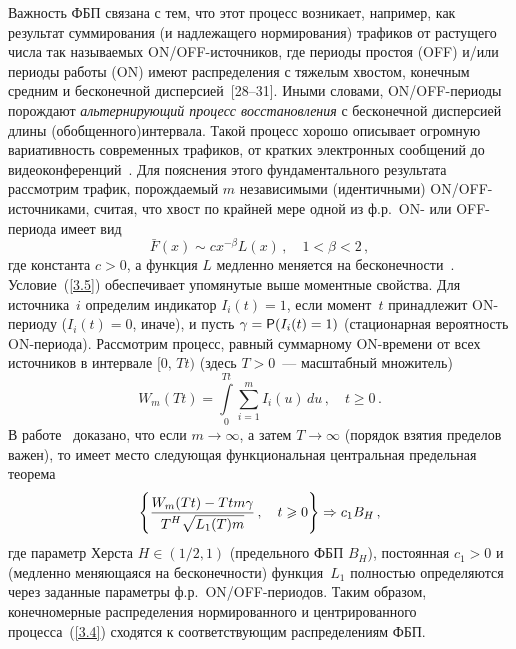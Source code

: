 \begin{multicols}{2}
Важность ФБП связана с тем, что этот процесс возникает, например,
как результат суммирования (и надлежащего нормирования) трафиков от
растущего числа так называемых ON/OFF-ис\-точн\-иков, где пе\-рио\-ды простоя (OFF) и/или пе\-рио\-ды
работы (ON) имеют распределения с
тяжелым хвос\-том, конечным средним и бесконечной дис\-пер\-си\-ей~[28--31].
Иными словами, ON/OFF-пе\-рио\-ды порождают {\it альтернирующий процесс восстановления} с бесконечной
дисперсией длины (обобщенного)\linebreak интервала. Такой процесс хорошо
описывает огромную вариативность современных трафиков, от кратких
электронных сообщений до видеоконференций~\cite {Will}. Для
пояснения этого фундаментального результата рассмотрим трафик,
по\-рож\-да\-емый $m$ независимыми (идентичными) ON/\linebreak OFF-источниками,
считая, что хвост по крайней мере одной из ф.р.\ ON- или OFF-периода имеет вид
\begin{equation}
 \bar F(x)\sim c x^{-\beta}L (x)\,,\quad 1<\beta<2\,,
 \label{3.5}
 \end{equation}
 где константа $c>0$, а функция $L$ медленно меняется на
 бесконечности~\cite {Taqqu, Resnick}. Условие~(\ref{3.5}) обеспечивает
 упомянутые выше моментные свойства. Для источника~$i$ определим индикатор
 $I_i(t)=1$, если момент~$t$ принадлежит ON-периоду ($I_i(t)=0$, иначе),
 и пусть $\gamma={\sf P}(I_i(t)=1)$ (стационарная вероятность ON-периода).
 Рассмотрим процесс, равный суммарному ON-времени от всех источников
 в интервале $[0,\,Tt)$ (здесь $T>0$~--- масштабный множитель)
\begin{equation}
 W_m(Tt)=\int\limits_0^{Tt}\sum\limits_{i=1}^mI_i(u)\,du\,,\quad t\ge 0\,.
 \label{3.4}
\end{equation}
В работе~\cite {Taqqu} доказано, что если $m\to \infty$,
 а затем $T\to \infty$ (порядок взятия пределов важен), то
 имеет место следующая функциональная центральная предельная теорема
\begin{equation}
 \left\{ \displaystyle\frac{\displaystyle W_m(Tt)-Ttm\gamma\mathstrut}{\displaystyle T^H\sqrt{L_1(T)m}\mathstrut}\,,\quad t\geqslant 0\right\}\Rightarrow c_1 B_H\,,
 \label{3.7}
\end{equation}
 где параметр Херста $H\in (1/2,1)$ (предельного ФБП $B_H$),
 постоянная $c_1>0$ и (медленно меняющаяся на бесконечности) функция~$L_1$
 полностью определяются через заданные параметры ф.р.\ ON/OFF-пе\-рио\-дов.
 Таким образом, конечномерные рас\-пре\-де\-ления нормированного
 и центрированного\linebreak
 процесса~(\ref{3.4}) сходятся к соответствующим распределениям ФБП.

\end{multicols}
